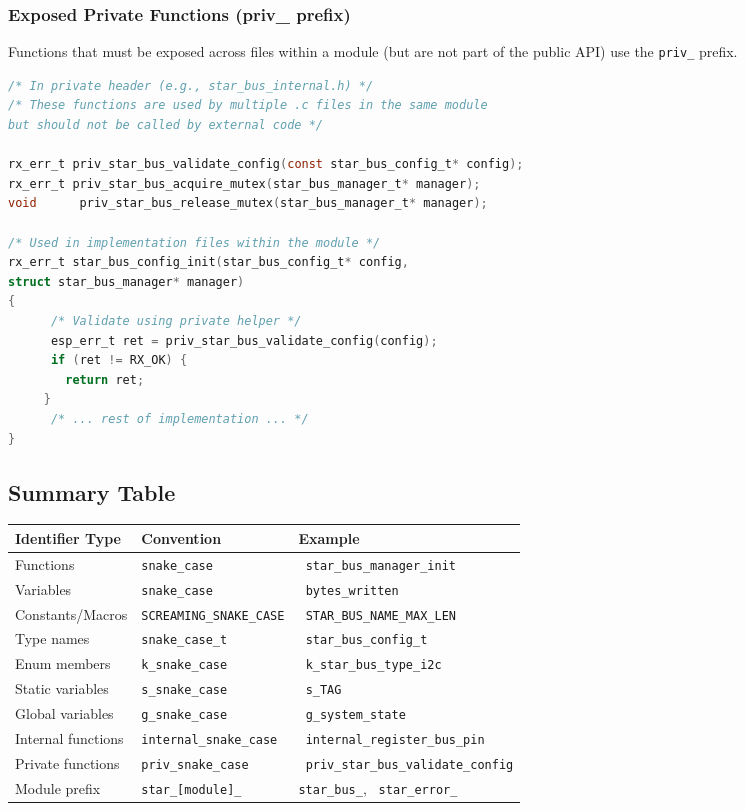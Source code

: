 \subsubsection{Exposed Private Functions (priv\_ prefix)}

Functions that must be exposed across files within a module (but are not part of the public API) use the \texttt{priv\_} prefix.

\begin{lstlisting}[language=C]
/* In private header (e.g., star_bus_internal.h) */
/* These functions are used by multiple .c files in the same module
but should not be called by external code */

rx_err_t priv_star_bus_validate_config(const star_bus_config_t* config);
rx_err_t priv_star_bus_acquire_mutex(star_bus_manager_t* manager);
void      priv_star_bus_release_mutex(star_bus_manager_t* manager);

/* Used in implementation files within the module */
rx_err_t star_bus_config_init(star_bus_config_t* config,
struct star_bus_manager* manager)
{
      /* Validate using private helper */
      esp_err_t ret = priv_star_bus_validate_config(config);
      if (ret != RX_OK) {
        return ret;
     }
      /* ... rest of implementation ... */
}
\end{lstlisting}

\subsection{Summary Table}

\begin{center}
\begin{tabular}{|l|l|l|}
\hline
\textbf{Identifier Type} & \textbf{Convention} & \textbf{Example} \\
\hline
Functions & \texttt{snake\_case} & \texttt{
      star\_bus\_manager\_init} \\
\hline
Variables & \texttt{snake\_case} & \texttt{
      bytes\_written} \\
\hline
Constants/Macros & \texttt{SCREAMING\_SNAKE\_CASE} & \texttt{
      STAR\_BUS\_NAME\_MAX\_LEN} \\
\hline
Type names & \texttt{snake\_case\_t} & \texttt{
      star\_bus\_config\_t} \\
\hline
Enum members & \texttt{k\_snake\_case} & \texttt{
      k\_star\_bus\_type\_i2c} \\
\hline
Static variables & \texttt{s\_snake\_case} & \texttt{
      s\_TAG} \\
\hline
Global variables & \texttt{g\_snake\_case} & \texttt{
      g\_system\_state} \\
\hline
Internal functions & \texttt{internal\_snake\_case} & \texttt{
      internal\_register\_bus\_pin} \\
\hline
Private functions & \texttt{priv\_snake\_case} & \texttt{
      priv\_star\_bus\_validate\_config} \\
\hline
Module prefix & \texttt{star\_[module]\_} & \texttt{star\_bus\_}, \texttt{
      star\_error\_} \\
\hline
\end{tabular}
\end{center}



